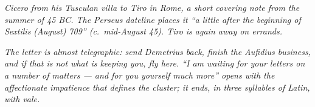 
\textit{Cicero from his Tusculan villa to Tiro in Rome, a short
covering note from the summer of 45 BC. The Perseus dateline places
it ``a little after the beginning of Sextilis (August) 709''
(c.\ mid-August 45). Tiro is again away on errands.}

\textit{The letter is almost telegraphic: send Demetrius back, finish
the Aufidius business, and if that is not what is keeping you, fly
here. ``I am waiting for your letters on a number of matters --- and
for you yourself much more'' opens with the affectionate impatience
that defines the cluster; it ends, in three syllables of Latin, with
\textit{vale}.}
